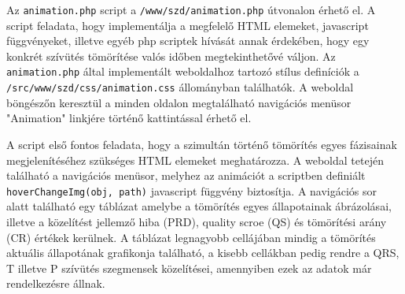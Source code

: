 \documentclass[oneside,titlepage,12pt,a4paper]{report}
\begin{document}
Az \texttt{animation.php} script a \texttt{/www/szd/animation.php} útvonalon érhető el. A script feladata, hogy implementálja a megfelelő HTML elemeket, javascript függvényeket, illetve egyéb php scriptek hívását annak érdekében, hogy egy konkrét szívütés tömörítése valós időben megtekinthetővé váljon. Az \texttt{animation.php} által implementált weboldalhoz tartozó stílus definíciók a \texttt{/src/www/szd/css/animation.css} állományban találhatók. A weboldal böngészőn keresztül a minden oldalon megtalálható navigációs menüsor "Animation" linkjére történő kattintással érhető el.
\par A script első fontos feladata, hogy a szimultán történő tömörítés egyes fázisainak megjelenítéséhez szükséges HTML elemeket meghatározza. A weboldal tetején található a navigációs menüsor, melyhez az animációt a scriptben definiált \texttt{hoverChangeImg(obj, path)} javascript függvény biztosítja. A navigációs sor alatt található egy táblázat amelybe a tömörítés egyes állapotainak ábrázolásai, illetve a közelítést jellemző hiba (PRD), quality scroe (QS) és tömörítési arány (CR) értékek kerülnek. A táblázat legnagyobb cellájában mindig a tömörítés aktuális állapotának grafikonja található, a kisebb cellákban pedig rendre a QRS, T illetve P szívütés szegmensek közelítései, amennyiben ezek az adatok már rendelkezésre állnak. 
\end{document}
